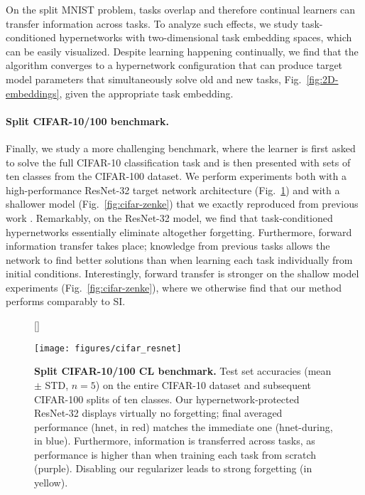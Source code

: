 \documentclass{article}
\begin{document}
On the split MNIST problem, tasks overlap and therefore continual learners can transfer information across tasks. To analyze such effects, we study task-conditioned hypernetworks with two-dimensional task embedding spaces, which can be easily visualized. Despite learning happening continually, we find that the algorithm converges to a hypernetwork configuration that can produce target model parameters that simultaneously solve old and new tasks, Fig.~\ref{fig:2D-embeddings}, given the appropriate task embedding.

\vspace{-2mm}
\paragraph{Split CIFAR-10/100 benchmark.} Finally, we study a more challenging benchmark, where the learner is first asked to solve the full CIFAR-10 classification task and is then presented with sets of ten classes from the CIFAR-100 dataset. We perform experiments both with a high-performance ResNet-32 target network architecture (Fig.~\ref{fig:cifar}) and with a shallower model (Fig.~\ref{fig:cifar-zenke}) that we exactly reproduced from previous work \citep{zenke_continual_2017}. Remarkably, on the ResNet-32 model, we find that task-conditioned hypernetworks essentially eliminate altogether forgetting. Furthermore, forward information transfer takes place; knowledge from previous tasks allows the network to find better solutions than when learning each task individually from initial conditions. Interestingly, forward transfer is stronger on the shallow model experiments (Fig.~\ref{fig:cifar-zenke}), where we otherwise find that our method performs comparably to SI.

\begin{figure}
    [\FBwidth]
    {\caption{\textbf{Split CIFAR-10/100 CL benchmark.} Test set accuracies (mean $\pm$ STD, $n=5$) on the entire CIFAR-10 dataset and subsequent CIFAR-100 splits of ten classes. Our hypernetwork-protected ResNet-32 displays virtually no forgetting; final averaged performance (hnet, in red) matches the immediate one (hnet-during, in blue). Furthermore, information is transferred across tasks, as performance is higher than when training each task from scratch (purple). Disabling our regularizer leads to strong forgetting (in yellow).\label{fig:cifar}}}
    {\texttt{[image: figures/cifar\_resnet]}}
\end{figure}
\end{document}
